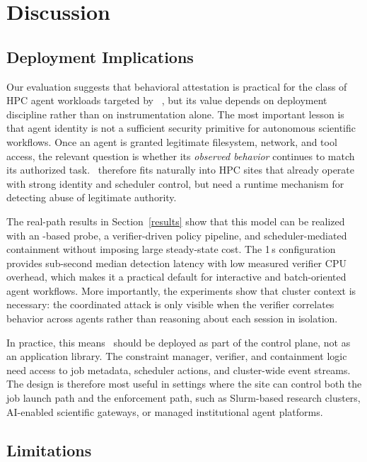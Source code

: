 \section{Discussion}

\subsection{Deployment Implications}

Our evaluation suggests that behavioral attestation is practical for the class
of HPC agent workloads targeted by \projectname~, but its value depends on deployment
discipline rather than on instrumentation alone. The most important lesson is
that agent identity is not a sufficient security primitive for autonomous
scientific workflows. Once an agent is granted legitimate filesystem, network,
and tool access, the relevant question is whether its \emph{observed behavior}
continues to match its authorized task. \projectname~therefore fits naturally into HPC
sites that already operate with strong identity and scheduler control, but need
a runtime mechanism for detecting abuse of legitimate authority.

The real-path results in Section~\ref{results} show that this model can be realized with an
\ebpf-based probe, a verifier-driven policy pipeline, and scheduler-mediated
containment without imposing large steady-state cost. The 1\,s configuration
provides sub-second median detection latency with low measured verifier CPU
overhead, which makes it a practical default for interactive and batch-oriented
agent workflows. More importantly, the experiments show that cluster context is
necessary: the coordinated attack is only visible when the verifier correlates
behavior across agents rather than reasoning about each session in isolation.

In practice, this means \projectname~should be deployed as part of the control plane,
not as an application library. The constraint manager, verifier, and containment
logic need access to job metadata, scheduler actions, and cluster-wide event
streams. The design is therefore most useful in settings where the site can
control both the job launch path and the enforcement path, such as Slurm-based
research clusters, AI-enabled scientific gateways, or managed institutional
agent platforms.

\subsection{Limitations}

